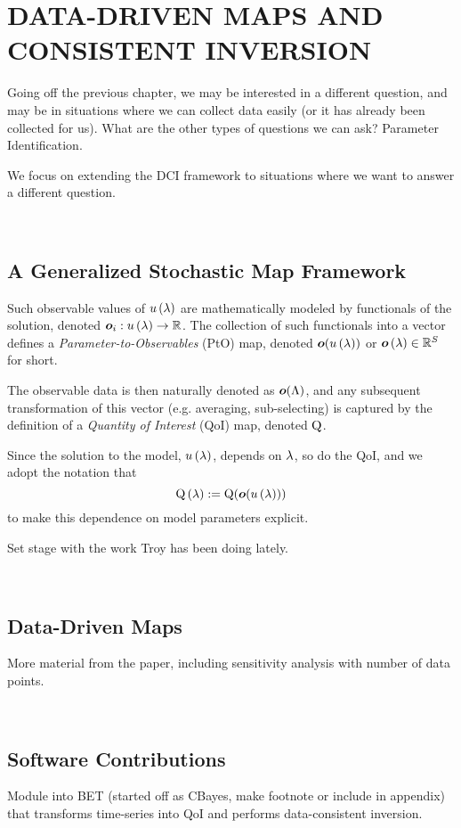 \chapter{\uppercase{Data-Driven Maps and Consistent Inversion} \label{chapter:04}}

Going off the previous chapter, we may be interested in a different question, and may be in situations where we can collect data easily (or it has already been collected for us).
What are the other types of questions we can ask? Parameter Identification. 

We focus on extending the DCI framework to situations where we want to answer a different question.

\
\section{A Generalized Stochastic Map Framework}
Such observable values of $u\operatorname*{\left ( \lambda \right )}$ are mathematically modeled by functionals of the solution, denoted $\operatorname*{\boldsymbol{o}}_i: u\operatorname*{\left ( \lambda \right )} \to \mathbb{R}$.
The collection of such functionals into a vector defines a {\em Parameter-to-Observables} (PtO) map, denoted $\operatorname*{\boldsymbol{o}}( u\operatorname*{\left ( \lambda \right )} )$ or $\operatorname*{\boldsymbol{o}}\operatorname*{\left ( \lambda \right )}\in\mathbb{R}^S$ for short. 

The observable data is then naturally denoted as $\operatorname*{\boldsymbol{o}}(\Lambda)$, and any subsequent transformation of this vector (e.g. averaging, sub-selecting) is captured by the definition of a {\em Quantity of Interest} (QoI) map, denoted $\operatorname*{Q}$.

Since the solution to the model, $u\operatorname*{\left ( \lambda \right )}$, depends on $\lambda$, so do the QoI, and we adopt the notation that $$\operatorname*{\operatorname*{Q}\operatorname*{\left ( \lambda \right )}} := \operatorname*{Q}(\operatorname*{\boldsymbol{o}}(u\operatorname*{\left ( \lambda \right )}))$$ to make this dependence on model parameters explicit.

Set stage with the work Troy has been doing lately.

\
\section{Data-Driven Maps}

More material from the paper, including sensitivity analysis with number of data points.

\
\section{Software Contributions}

Module into BET (started off as CBayes, make footnote or include in appendix) that transforms time-series into QoI and performs data-consistent inversion.

